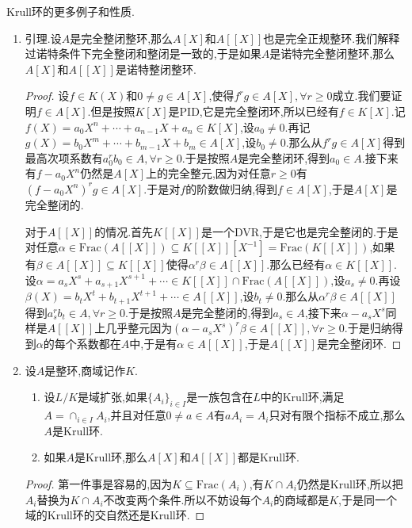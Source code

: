 Krull环的更多例子和性质.
\begin{enumerate}
	\item 引理.设$A$是完全整闭整环,那么$A[X]$和$A[[X]]$也是完全正规整环.我们解释过诺特条件下完全整闭和整闭是一致的,于是如果$A$是诺特完全整闭整环,那么$A[X]$和$A[[X]]$是诺特整闭整环.
	\begin{proof}
		
		设$f\in K(X)$和$0\not=g\in A[X]$,使得$f^rg\in A[X],\forall r\ge0$成立.我们要证明$f\in A[X]$.但是按照$K[X]$是PID,它是完全整闭环,所以已经有$f\in K[X]$.记$f(X)=a_0X^n+\cdots+a_{n-1}X+a_n\in K[X]$,设$a_0\not=0$.再记$g(X)=b_0X^m+\cdots+b_{m-1}X+b_m\in A[X]$,设$b_0\not=0$.那么从$f^rg\in A[X]$得到最高次项系数有$a_0^rb_0\in A,\forall r\ge0$.于是按照$A$是完全整闭环,得到$a_0\in A$.接下来有$f-a_0X^n$仍然是$A[X]$上的完全整元,因为对任意$r\ge0$有$(f-a_0X^n)^rg\in A[X]$.于是对$f$的阶数做归纳,得到$f\in A[X]$,于是$A[X]$是完全整闭的.
		
		\qquad
		
		对于$A[[X]]$的情况.首先$K[[X]]$是一个DVR,于是它也是完全整闭的.于是对任意$\alpha\in\mathrm{Frac}(A[[X]])\subseteq K[[X]][X^{-1}]=\mathrm{Frac}(K[[X]])$,如果有$\beta\in A[[X]]\subseteq K[[X]]$使得$\alpha^r\beta\in A[[X]]$.那么已经有$\alpha\in K[[X]]$.设$\alpha=a_sX^s+a_{s+1}X^{s+1}+\cdots\in K[[X]]\cap\mathrm{Frac}(A[[X]])$,设$a_s\not=0$.再设$\beta(X)=b_tX^t+b_{t+1}X^{t+1}+\cdots\in A[[X]]$,设$b_t\not=0$.那么从$\alpha^r\beta\in A[[X]]$得到$a_s^rb_t\in A,\forall r\ge0$.于是按照$A$是完全整闭的,得到$a_s\in A$,接下来$\alpha-a_sX^s$同样是$A[[X]]$上几乎整元因为$(\alpha-a_sX^s)^r\beta\in A[[X]],\forall r\ge0$.于是归纳得到$\alpha$的每个系数都在$A$中,于是有$\alpha\in A[[X]]$,于是$A[[X]]$是完全整闭环.
	\end{proof}
    \item 设$A$是整环,商域记作$K$.
    \begin{enumerate}
    	\item 设$L/K$是域扩张,如果$\{A_i\}_{i\in I}$是一族包含在$L$中的Krull环,满足$A=\cap_{i\in I}A_i$,并且对任意$0\not=a\in A$有$aA_i=A_i$只对有限个指标不成立,那么$A$是Krull环.
    	\item 如果$A$是Krull环,那么$A[X]$和$A[[X]]$都是Krull环.
    \end{enumerate}
    \begin{proof}
    	
    	第一件事是容易的,因为$K\subseteq\mathrm{Frac}(A_i)$,有$K\cap A_i$仍然是Krull环,所以把$A_i$替换为$K\cap A_i$不改变两个条件.所以不妨设每个$A_i$的商域都是$K$,于是同一个域的Krull环的交自然还是Krull环.
    	

\end{proof}
\end{enumerate}
